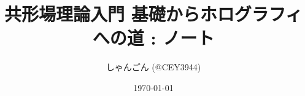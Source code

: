 \documentclass[11pt,dvipdfmx,a4paper]{jsreport}
\title{共形場理論入門 基礎からホログラフィへの道 : ノート}
\author{しゃんごん (@CEY3944)}
\date{\today}
\begin{document}
\maketitle
\tableofcontents

\clearpage

\clearpage

\clearpage

% 
% 
% 
% 
% 
% 




\nocite{*}
\end{document}

